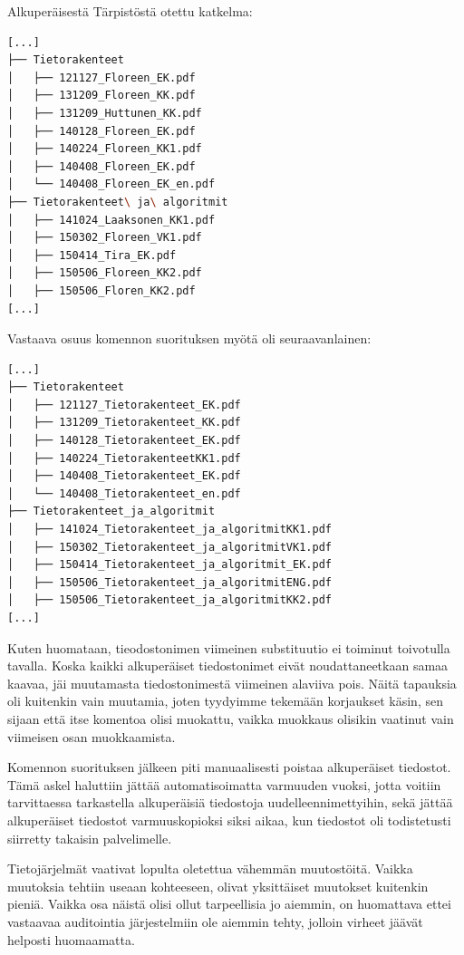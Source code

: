 \documentclass[finnish]{tktltiki}
\begin{document}
\newpage

Alkuperäisestä Tärpistöstä otettu katkelma:

\begin{lstlisting}[language=BASH,style=tree]
[...]
├── Tietorakenteet
│   ├── 121127_Floreen_EK.pdf
│   ├── 131209_Floreen_KK.pdf
│   ├── 131209_Huttunen_KK.pdf
│   ├── 140128_Floreen_EK.pdf
│   ├── 140224_Floreen_KK1.pdf
│   ├── 140408_Floreen_EK.pdf
│   └── 140408_Floreen_EK_en.pdf
├── Tietorakenteet\ ja\ algoritmit
│   ├── 141024_Laaksonen_KK1.pdf
│   ├── 150302_Floreen_VK1.pdf
│   ├── 150414_Tira_EK.pdf
│   ├── 150506_Floreen_KK2.pdf
│   ├── 150506_Floren_KK2.pdf
[...]
\end{lstlisting}

Vastaava osuus komennon suorituksen myötä oli seuraavanlainen:

\begin{lstlisting}[language=BASH,style=tree]
[...]
├── Tietorakenteet
│   ├── 121127_Tietorakenteet_EK.pdf
│   ├── 131209_Tietorakenteet_KK.pdf
│   ├── 140128_Tietorakenteet_EK.pdf
│   ├── 140224_TietorakenteetKK1.pdf
│   ├── 140408_Tietorakenteet_EK.pdf
│   └── 140408_Tietorakenteet_en.pdf
├── Tietorakenteet_ja_algoritmit
│   ├── 141024_Tietorakenteet_ja_algoritmitKK1.pdf
│   ├── 150302_Tietorakenteet_ja_algoritmitVK1.pdf
│   ├── 150414_Tietorakenteet_ja_algoritmit_EK.pdf
│   ├── 150506_Tietorakenteet_ja_algoritmitENG.pdf
│   ├── 150506_Tietorakenteet_ja_algoritmitKK2.pdf
[...]
\end{lstlisting}

Kuten huomataan, tieodostonimen viimeinen substituutio ei toiminut toivotulla tavalla. Koska kaikki alkuperäiset tiedostonimet eivät noudattaneetkaan samaa kaavaa, jäi muutamasta tiedostonimestä viimeinen alaviiva pois. Näitä tapauksia oli kuitenkin vain muutamia, joten tyydyimme tekemään korjaukset käsin, sen sijaan että itse komentoa olisi muokattu, vaikka muokkaus olisikin vaatinut vain viimeisen osan muokkaamista.

Komennon suorituksen jälkeen piti manuaalisesti poistaa alkuperäiset tiedostot. Tämä askel haluttiin jättää automatisoimatta varmuuden vuoksi, jotta voitiin tarvittaessa tarkastella alkuperäisiä tiedostoja uudelleennimettyihin, sekä jättää alkuperäiset tiedostot varmuuskopioksi siksi aikaa, kun tiedostot oli todistetusti siirretty takaisin palvelimelle.

Tietojärjelmät vaativat lopulta oletettua vähemmän muutostöitä. Vaikka muutoksia tehtiin useaan kohteeseen, olivat yksittäiset muutokset kuitenkin pieniä. Vaikka osa näistä olisi ollut tarpeellisia jo aiemmin, on huomattava ettei vastaavaa auditointia järjestelmiin ole aiemmin tehty, jolloin virheet jäävät helposti huomaamatta.
\end{document}
